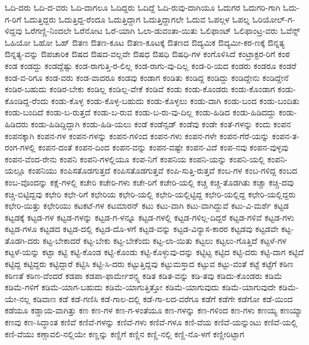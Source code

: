 {ಓದಿ-ದರು
ಓದಿ-ದ-ವರು
ಓದಿ-ದಾಗಲೂ
ಓದಿದ್ದರು
ಓದಿದ್ದೆ
ಓದಿ-ರುವು-ದಾಗಿಯೂ
ಓದುಗರ
ಓದುಗರಿ-ಗಾಗಿ
ಓದು-ಗ-ರಿಗೆ
ಓದುತ್ತಿದ್ದರು
ಓದುತ್ತಿದ್ದ-ರೆಂದೂ
ಓದುತ್ತಿದ್ದಾಗ
ಓದುತ್ತಿದ್ದಾಗಲೇ
ಓದುವ
ಓಪಲ್ಗಳ
ಓಪಲ್ನ
ಓರಿಯೋಲ್-ಗ-ಳಿದ್ದವು
ಓರೆಗಣ್ಣಿ-ನಿಂದಲೇ
ಓರೆನೋಟ
ಓರೆ-ಯಾಗಿ
ಓಲಾ-ಡುವಂತಾ-ಯಿತು
ಓಲಿಫಾಂಟ್
ಓಲಿಫಾಂಟ್ರ-ವರು
ಓವೆನ್ಸ್
ಓಹಿಯೋ
ಓಹೋ
ಓಹ್
ಔತಣ
ಔತಣ-ಕೂಟ
ಔತಣ-ಕೂಟಕ್ಕೆ
ಔತಣದ
ಔದ್ಯಮಿಕ
ಔದ್ಯಮೀ-ಕರ-ಣಕ್ಕೆ
ಔನ್ನತ್ಯ
ಔನ್ನತ್ಯ-ವನ್ನು
ಔಪಚಾರಿಕ
ಔಷದ
ಔಷದ-ವಲ್ಲವೇ
ಔಷಧ
ಔಷಧಿ
ಔಷಧಿ-ಗಳ
ಕಂಗೊಳಿಸಿದೆ
ಕಂಟ್ರಾಕ್ಟರ-ರಿಗೆ
ಕಂಠ
ಕಂಡ
ಕಂಡದ್ದು
ಕಂಡದ್ದೆಷ್ಟು
ಕಂಡ-ರಾಗುತ್ತಿ-ರ-ಲಿಲ್ಲ
ಕಂಡ-ರಾಗು-ವು-ದಿಲ್ಲ
ಕಂಡ-ರಿ-ಯದ
ಕಂಡರು
ಕಂಡರೂ
ಕಂಡರೆ
ಕಂಡ-ವ-ರಿಗೂ
ಕಂಡ-ವರು
ಕಂಡ-ವಾದರೂ
ಕಂಡವು
ಕಂಡಾಗ
ಕಂಡಿತು
ಕಂಡಿದ್ದ
ಕಂಡಿದ್ದು
ಕಂಡಿದ್ದೇನು
ಕಂಡಿದ್ದೇನೆ
ಕಂಡಿರ-ಬಹುದು
ಕಂಡಿರ-ಬೇಕು
ಕಂಡಿಲ್ಲ
ಕಂಡಿಲ್ಲ-ವೇಕೆ
ಕಂಡಿವೆ
ಕಂಡು
ಕಂಡು-ಕೊಂಡರು
ಕಂಡು-ಕೊಂಡಾಗ
ಕಂಡು-ಕೊಂಡಿದ್ದ-ರೆಂದು
ಕಂಡು-ಕೊಳ್ಳ
ಕಂಡು-ಕೊಳ್ಳ-ಬಹುದು
ಕಂಡು-ಕೊಳ್ಳಲು
ಕಂಡು-ದಾಗಿ
ಕಂಡು-ಬಂದ
ಕಂಡು-ಬಂದಿತು
ಕಂಡು-ಬಂದಿದೆ
ಕಂಡು-ಬ-ರುತ್ತದೆ
ಕಂಡು-ಬ-ರುವ
ಕಂಡು-ಬ-ರು-ವು-ದಿಲ್ಲ
ಕಂಡು-ಹಿಡಿದ
ಕಂಡು-ಹಿಡಿದದ್ದು
ಕಂಡು-ಹಿಡಿದರು
ಕಂಡು-ಹಿಡಿದ್ದಿದ್ದಾಗಿ
ಕಂಡು-ಹಿಡಿ-ಯಲು
ಕಂಡೆ
ಕಂಡೆನ್ಸಡ್
ಕಂಡೆವು
ಕಂಡೇ
ಕಂತೆ-ಗಳನ್ನು
ಕಂದು
ಕಂಪನ
ಕಂಪನಕ್ಕಾಗಿ
ಕಂಪನ-ಗಳ
ಕಂಪನ-ಗಳನ್ನು
ಕಂಪನ-ಗಳಿಂದ
ಕಂಪನ-ಗಳು
ಕಂಪನ-ಗಳೇ
ಕಂಪನ-ಗೆರೆ-ಯನ್ನು
ಕಂಪನ-ತ-ರಂಗ-ಗಳಲ್ಲಿ
ಕಂಪನ-ದಂತೆ
ಕಂಪನ-ದಿಂದ
ಕಂಪನ-ವನ್ನು
ಕಂಪನ-ವಷ್ಟೇ
ಕಂಪನ-ವಿದೆ
ಕಂಪ-ನವು
ಕಂಪನ-ವುಳ್ಳವು
ಕಂಪನ-ವೆಂದ-ರೇನು
ಕಂಪನಿ
ಕಂಪನಿ-ಗಳಲ್ಲಿಯೂ
ಕಂಪ-ನಿಗೆ
ಕಂಪನಿಯ
ಕಂಪನಿ-ಯನ್ನು
ಕಂಪನಿ-ಯಲ್ಲಿ
ಕಂಪನಿ-ಯಲ್ಲೂ
ಕಂಪನಿಯು
ಕಂಪಿಸತೊಡಗುತ್ತದೆ
ಕಂಪಿಸತೊಡಗುತ್ತವೆ
ಕಂಪಿ-ಸುತ್ತಿ-ರುತ್ತವೆ
ಕಂಬ-ಗಳ
ಕಂಬ-ಗಳಿದ್ದ
ಕಂಬದ
ಕಂಬ-ವೊಂದನ್ನು
ಕಕ್ಷೆ-ಗಳಲ್ಲಿ
ಕಚೇರಿ
ಕಚೇರಿ-ಗಳು
ಕಚೇ-ರಿಗೆ
ಕಚೇರಿ-ಯಲ್ಲಿ
ಕಚ್ಚ
ಕಚ್ಚ-ತೊಡಗಿತು
ಕಚ್ಚಾ
ಕಚ್ಚಿ-ದವು
ಕಚ್ಚಿ-ಬಿಟ್ಟಿದ್ದವು
ಕಛೇರಿ
ಕಛೇ-ರಿಗೆ
ಕಛೇರಿಯ
ಕಛೇರಿ-ಯಲ್ಲಿ
ಕಛೇರಿ-ಯಲ್ಲಿಟ್ಟಿದ್ದ
ಕಛೇರಿ-ಯಲ್ಲಿದ್ದ
ಕಛೇರಿ-ಯಲ್ಲಿದ್ದರು
ಕಛೇರಿ-ಯಿತ್ತು
ಕಛೇರಿಯು
ಕಟಕಟೆ-ಗಳ
ಕಟಮಾರನ್
ಕಟು
ಕಟು-ವಾಗಿ
ಕಟು-ವಾಗಿದ್ದುವೆ
ಕಟು-ವಿ-ಮರ್ಶೆ
ಕಟ್ಟಡ
ಕಟ್ಟಡಕ್ಕೆ
ಕಟ್ಟಡ-ಗಳ
ಕಟ್ಟಡ-ಗಳನ್ನು
ಕಟ್ಟಡ-ಗ-ಳನ್ನೂ
ಕಟ್ಟಡ-ಗಳಲ್ಲಿ
ಕಟ್ಟಡ-ಗಳಿಲ್ಲ-ದಿದ್ದರೆ
ಕಟ್ಟಡ-ಗಳಿವೆ
ಕಟ್ಟಡ-ಗಳು
ಕಟ್ಟಡ-ಗಳೂ
ಕಟ್ಟಡದ
ಕಟ್ಟಡ-ದಲ್ಲಿ
ಕಟ್ಟಡ-ದೊ-ಳಗೆ
ಕಟ್ಟಡ-ವನ್ನು
ಕಟ್ಟಡ-ವಿನ್ಯಾಸ-ಕಾರರ
ಕಟ್ಟಡವು
ಕಟ್ಟಡವೇ
ಕಟ್ಟ-ತೊಡಗಿ-ದರು
ಕಟ್ಟ-ಬೇಕಾದರೆ
ಕಟ್ಟ-ಬೇಕು
ಕಟ್ಟ-ಬೇಕೆಂದು
ಕಟ್ಟ-ಲಾ-ಯಿತು
ಕಟ್ಟಲು
ಕಟ್ಟಲು-ಗೊತ್ತಿದೆ
ಕಟ್ಟಳೆ-ಗಳ
ಕಟ್ಟಳೆ-ಯನ್ನು
ಕಟ್ಟಾ
ಕಟ್ಟಿ
ಕಟ್ಟಿ-ಕೊಂಡ
ಕಟ್ಟಿ-ಕೊಂಡು
ಕಟ್ಟಿ-ಕೊಳ್ಳುವು-ದನ್ನು
ಕಟ್ಟಿಟ್ಟ
ಕಟ್ಟಿದ
ಕಟ್ಟಿ-ದರು
ಕಟ್ಟಿ-ದಾಗ
ಕಟ್ಟಿದೆ
ಕಟ್ಟಿದ್ದ
ಕಟ್ಟಿದ್ದರು
ಕಟ್ಟಿದ್ದಾರೆ
ಕಟ್ಟಿಸಿ
ಕಟ್ಟಿ-ಸಿ-ದರು
ಕಟ್ಟುತ್ತಿದ್ದವು
ಕಟ್ಟುಮಸ್ತಾದ
ಕಟ್ಟುವ
ಕಟ್ಟು-ವಂತೆ
ಕಟ್ಟೆ
ಕಟ್ಟೆಗೆ
ಕಠಿಣ
ಕಠಿಣತೆ
ಕಠಿಣ-ವೆಂದರೆ
ಕಡಪಾ
ಕಡಪಾ-ಫಾರ್ಮೇಶನ್ಸ್ನ
ಕಡಿತ
ಕಡಿತ-ವನ್ನು
ಕಡಿ-ತವು
ಕಡಿದು-ಕೊಂಡರು
ಕಡಿಮೆ
ಕಡಿಮೆ-ಗಳಿಗೆ
ಕಡಿಮೆ-ಯಾಗ-ಬಹುದು
ಕಡಿಮೆ-ಯಾಗುತ್ತಿತ್ತೋ
ಕಡಿಮೆ-ಯಾಗುವುದು
ಕಡಿಮೆ-ಯಾಗುವುದೇ
ಕಡಿಮೆ-ಯೇ-ನಲ್ಲ
ಕಡಿವಾಣ
ಕಡೆ
ಕಡೆ-ಗಣಿಸಿ
ಕಡೆ-ಗಾಲ-ದಲ್ಲಿ
ಕಡೆ-ಗಾ-ಲದ-ವರೆಗೂ
ಕಡೆಗೆ
ಕಡೆಗೇ
ಕಡೆಗೋ
ಕಡೆ-ಯಿಂದ
ಕಡೆಯೂ
ಕಡ್ಡಾಯ-ವಾಗಿತ್ತು
ಕಣ
ಕಣ-ಗಳ
ಕಣ-ಗ-ಳಂತೆಯೂ
ಕಣ-ಗಳನ್ನು
ಕಣ-ಗಳಿಂದ
ಕಣ-ಗಳು
ಕಣಯ್ಯ
ಕಣಯ್ಯಾ
ಕಣವು
ಕಣ-ಸಿದ್ಧಾಂತ
ಕಣಿವೆ
ಕಣಿವೆ-ಗಳನ್ನು
ಕಣಿವೆ-ಗಳು
ಕಣಿವೆ-ಗಳೂ
ಕಣಿ-ವೆಯ
ಕಣಿವೆ-ಯನ್ನುಂಟು
ಕಣಿವೆ-ಯಲ್ಲಿ
ಕಣಿ-ವೆಯು
ಕಣ್ಗಾವಲಿ-ನಲ್ಲಿಯೇ
ಕಣ್ಣನ್ನು
ಕಣ್ಣಿಗೆ
ಕಣ್ಣಿನ
ಕಣ್ಣಿ-ನಲ್ಲಿ
ಕಣ್ಣಿ-ನೊ-ಳಗೆ
ಕಣ್ಣೀರಿಟ್ಟಾಗ
}
